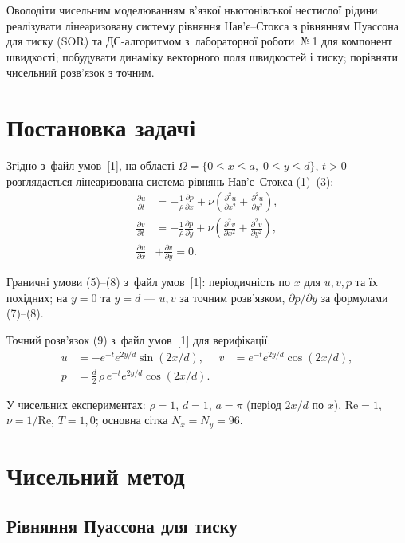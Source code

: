 \documentclass[14pt,a4paper,extarticle]{extarticle}
\newcommand{\Rey}{\mathrm{Re}}
\newcommand{\lrcond}{файл умов~[1]}
\newcommand{\lrone}{лабораторної роботи~№\,1}
\begin{document}
Оволодіти чисельним моделюванням в'язкої ньютонівської нестислої рідини:
реалізувати лінеаризовану систему рівняння Нав'є--Стокса з рівнянням Пуассона
для тиску (SOR) та ДС-алгоритмом з~\lrone{} для компонент швидкості; побудувати динаміку
векторного поля швидкостей і тиску; порівняти чисельний розв'язок з точним.

\section{Постановка задачі}

Згідно з~\lrcond{}, на області $\Omega=\{0\le x\le a,\;0\le y\le d\}$, $t>0$
розглядається лінеаризована система рівнянь Нав'є--Стокса (1)--(3):
\begin{align}
  \frac{\partial u}{\partial t} &= -\frac{1}{\rho}\frac{\partial p}{\partial x}
    + \nu\left(\frac{\partial^2 u}{\partial x^2}+\frac{\partial^2 u}{\partial y^2}\right), \label{eq:u}\\
  \frac{\partial v}{\partial t} &= -\frac{1}{\rho}\frac{\partial p}{\partial y}
    + \nu\left(\frac{\partial^2 v}{\partial x^2}+\frac{\partial^2 v}{\partial y^2}\right), \label{eq:v}\\
  \frac{\partial u}{\partial x} &+ \frac{\partial v}{\partial y} = 0. \label{eq:div}
\end{align}

Граничні умови (5)--(8) з~\lrcond{}: періодичність по $x$ для $u,v,p$ та їх
похідних; на $y=0$ та $y=d$ --- $u,v$ за точним розв'язком,
$\partial p/\partial y$ за формулами (7)--(8).

Точний розв'язок (9) з~\lrcond{} для верифікації:
\begin{align}
  u &= -e^{-t}e^{2y/d}\sin(2x/d), &
  v &= e^{-t}e^{2y/d}\cos(2x/d), \label{eq:exact-uv}\\
  p &= \frac{d}{2}\,\rho\, e^{-t}e^{2y/d}\cos(2x/d). \label{eq:exact-p}
\end{align}

У чисельних експериментах: $\rho=1$, $d=1$, $a=\pi$ (період $2x/d$ по $x$),
$\Rey=1$, $\nu=1/\Rey$, $T=1{,}0$; основна сітка $N_x=N_y=96$.

\section{Чисельний метод}

\subsection{Рівняння Пуассона для тиску}
\end{document}
